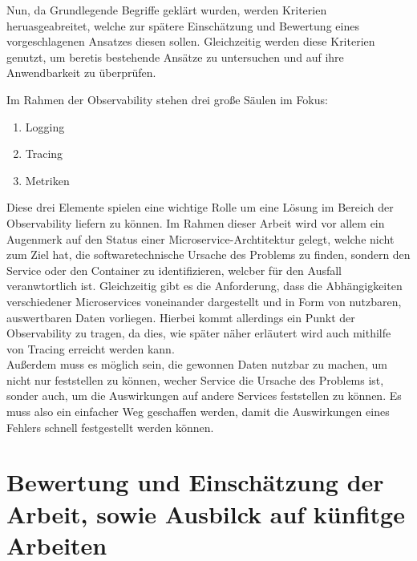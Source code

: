\documentclass[
	12pt,
	BCOR=5mm,
	DIV=12,
	headinclude=on,
	footinclude=off,
	parskip=half,
	bibliography=totoc,
	listof=entryprefix,
	toc=listof,
	numbers=noenddot,
	plainfootsepline
]{scrreprt}
\begin{document}
Nun, da Grundlegende Begriffe geklärt wurden, werden Kriterien heruasgeabreitet, welche zur spätere Einschätzung und Bewertung eines vorgeschlagenen Ansatzes diesen sollen. Gleichzeitig werden diese Kriterien genutzt, um beretis bestehende Ansätze zu untersuchen und auf ihre Anwendbarkeit zu überprüfen.

Im Rahmen der Observability stehen drei große Säulen im Fokus:
\begin{enumerate}
	\item Logging
	\item Tracing
	\item Metriken
\end{enumerate}

Diese drei Elemente spielen eine wichtige Rolle um eine Lösung im Bereich der Observability liefern zu können. Im Rahmen dieser Arbeit wird vor allem ein Augenmerk auf den Status einer Microservice-Archtitektur gelegt, welche nicht zum Ziel hat, die softwaretechnische Ursache des Problems zu finden, sondern den Service oder den Container zu identifizieren, welcber für den Ausfall veranwtortlich ist. Gleichzeitig gibt es die Anforderung, dass die Abhängigkeiten verschiedener Microservices voneinander dargestellt und in Form von nutzbaren, auswertbaren Daten vorliegen. Hierbei kommt allerdings ein Punkt der Observability zu tragen, da dies, wie später näher erläutert wird auch mithilfe von Tracing erreicht werden kann.\\
Außerdem muss es möglich sein, die gewonnen Daten nutzbar zu machen, um nicht nur feststellen zu können, wecher Service die Ursache des Problems ist, sonder auch, um die Auswirkungen auf andere Services feststellen zu können. Es muss also ein einfacher Weg geschaffen werden, damit die Auswirkungen eines Fehlers schnell festgestellt werden können. 

\chapter{Bewertung und Einschätzung der Arbeit, sowie Ausbilck auf künfitge Arbeiten}
\clearpage
\ihead{}
\printbibliography[title=Literaturverzeichnis]
\cleardoublepage



\end{document}
